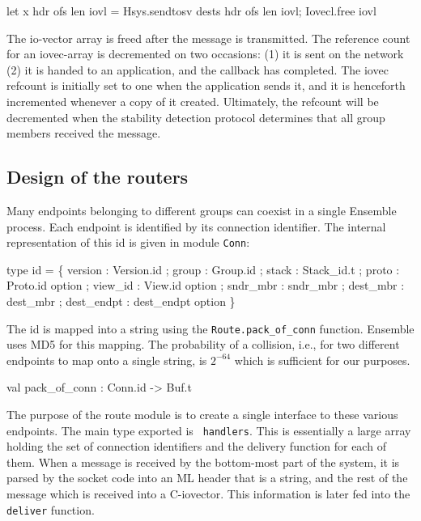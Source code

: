 \begin{codebox}
  let x hdr ofs len iovl = 
    Hsys.sendtosv dests hdr ofs len iovl;
    Iovecl.free iovl
\end{codebox}

The io-vector array is freed after the message is transmitted. The
reference count for an iovec-array is decremented on two occasions:
(1) it is sent on the network (2) it is handed to an application, and
the callback has completed. The iovec refcount is initially set to one
when the application sends it, and it is henceforth incremented
whenever a copy of it created. Ultimately, the refcount will be
decremented when the stability detection protocol determines that all
group members received the message.

\subsection{Design of the routers}
Many endpoints belonging to different groups can coexist in a single
Ensemble process. Each endpoint is identified by its connection
identifier. The internal representation of this id is given in module
{\tt Conn}:

\begin{codebox}
type id = \{
  version       : Version.id ;
  group 	: Group.id ;
  stack 	: Stack_id.t ;
  proto 	: Proto.id option ;
  view_id 	: View.id option ;
  sndr_mbr 	: sndr_mbr ;
  dest_mbr 	: dest_mbr ;
  dest_endpt 	: dest_endpt option
\}
\end{codebox}

The id is mapped into a string using the {\tt Route.pack\_of\_conn}
function. Ensemble uses MD5 for this mapping. The probability of a
collision, i.e., for two different endpoints to map onto a single
string, is $2^{-64}$ which is sufficient for our purposes. 

\begin{codebox}
val pack_of_conn : Conn.id -> Buf.t
\end{codebox}

The purpose of the route module is to create a single interface to
these various endpoints. The main type exported is {\tt
handlers}. This is essentially a large array holding the set of
connection identifiers and the delivery function for each of
them. When a message is received by the bottom-most part of the
system, it is parsed by the socket code into an ML header that is a
string, and the rest of the message which is received into a
C-iovector. This information is later fed into the {\tt deliver}
function.

